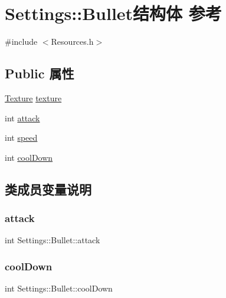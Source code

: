 \hypertarget{struct_settings_1_1_bullet}{}\section{Settings\+:\+:Bullet结构体 参考}
\label{struct_settings_1_1_bullet}


{\ttfamily \#include $<$Resources.\+h$>$}

\subsection*{Public 属性}
\begin{DoxyCompactItemize}
\item 
\hyperlink{struct_texture}{Texture} \hyperlink{struct_settings_1_1_bullet_a274a4b14c0bfaa540c5e60c273567bbd}{texture}
\item 
int \hyperlink{struct_settings_1_1_bullet_a21e484cc6e290496e36a68da5b1a7b76}{attack}
\item 
int \hyperlink{struct_settings_1_1_bullet_a8969e02d4dba2f87284855e0a141f6f3}{speed}
\item 
int \hyperlink{struct_settings_1_1_bullet_a00faad5dff02426e73ab0326057b66ed}{cool\+Down}
\end{DoxyCompactItemize}


\subsection{类成员变量说明}
\mbox{\label{struct_settings_1_1_bullet_a21e484cc6e290496e36a68da5b1a7b76}} 
\subsubsection{\texorpdfstring{attack}{attack}}
{\footnotesize\ttfamily int Settings\+::\+Bullet\+::attack}

\mbox{\label{struct_settings_1_1_bullet_a00faad5dff02426e73ab0326057b66ed}} 
\subsubsection{\texorpdfstring{cool\+Down}{coolDown}}
{\footnotesize\ttfamily int Settings\+::\+Bullet\+::cool\+Down}

